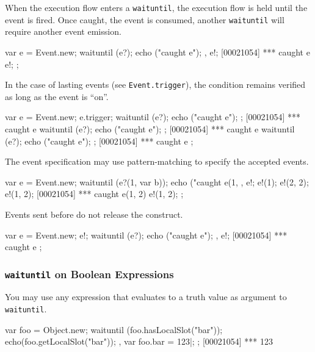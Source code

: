 When the execution flow enters a \lstinline|waituntil|, the execution
flow is held until the event is fired.  Once caught, the event is
consumed, another \lstinline|waituntil| will require another event
emission.

\begin{urbiscript}[firstnumber=last]
{
  var e = Event.new;
  {
    waituntil (e?);
    echo ("caught e");
  },
  e!;
[00021054] *** caught e
  e!;
};
\end{urbiscript}

In the case of lasting events (see \lstinline|Event.trigger|), the
condition remains verified as long as the event is ``on''.

\begin{urbiscript}[firstnumber=last]
{
  var e = Event.new;
  e.trigger;
  {
    waituntil (e?);
    echo ("caught e");
  };
[00021054] *** caught e
  {
    waituntil (e?);
    echo ("caught e");
  };
[00021054] *** caught e
  {
    waituntil (e?);
    echo ("caught e");
  };
[00021054] *** caught e
};
\end{urbiscript}

The event specification may use pattern-matching to specify the
accepted events.

\begin{urbiscript}[firstnumber=last]
{
  var e = Event.new;
  {
    waituntil (e?(1, var b));
    echo ("caught e(1, %
  },
  e!;
  e!(1);
  e!(2, 2);
  e!(1, 2);
[00021054] *** caught e(1, 2)
  e!(1, 2);
};
\end{urbiscript}

Events sent before do not release the construct.

\begin{urbiscript}[firstnumber=last]
{
  var e = Event.new;
  e!;
  {
    waituntil (e?);
    echo ("caught e");
  },
  e!;
[00021054] *** caught e
};
\end{urbiscript}

\subsubsection{\lstinline'waituntil' on Boolean Expressions}

You may use any expression that evaluates to a truth value as argument
to \lstinline'waituntil'.

\begin{urbiscript}[firstnumber=last]
{
  var foo = Object.new;
  {
    waituntil (foo.hasLocalSlot("bar"));
    echo(foo.getLocalSlot("bar"));
  },
  var foo.bar = 123|;
};
[00021054] *** 123
\end{urbiscript}

